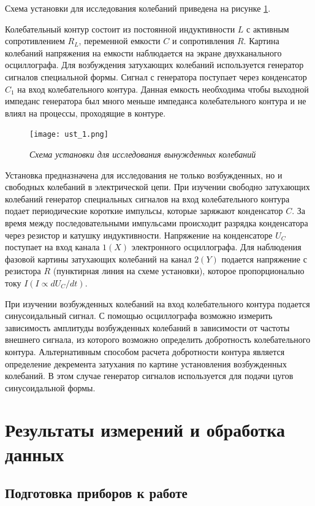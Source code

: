 \documentclass[a4paper,12pt]{article}
\begin{document}
Схема установки для исследования колебаний приведена на рисунке \ref{pic:1}.

Колебательный контур состоит из постоянной индуктивности $L$ с активным сопротивлением $R_L$, переменной емкости $C$ и сопротивления $R$. Картина колебаний напряжения на емкости наблюдается на экране двухканального осциллографа. Для возбуждения затухающих колебаний используется генератор сигналов специальной формы. Сигнал с генератора поступает через конденсатор $C_1$ на вход колебательного контура. Данная емкость необходима чтобы выходной импеданс генератора был много меньше импеданса колебательного контура и не влиял на процессы, проходящие в контуре.

\begin{figure}[h!]
    \texttt{[image: ust\_1.png]}
    \caption{\textit{Схема установки для исследования вынужденных колебаний}}
    \label{pic:1}
\end{figure}

Установка предназначена для исследования не только возбужденных, но и свободных колебаний в электрической цепи. При изучении свободно затухающих колебаний генератор специальных сигналов на вход колебательного контура подает периодические короткие импульсы, которые заряжают конденсатор $C$. За время между последовательными импульсами происходит разрядка конденсатора через резистор и катушку индуктивности. Напряжение на конденсаторе $U_C$ поступает на вход канала $1(X)$ электронного осциллографа. Для наблюдения фазовой картины затухающих колебаний на канал $2(Y)$ подается напряжение с резистора $R$ (пунктирная линия на схеме установки), которое пропорционально току $I (I \propto d U_C / dt)$.

При изучении возбужденных колебаний на вход колебательного контура подается синусоидальный сигнал. С помощью осциллографа возможно измерить зависимость амплитуды возбужденных колебаний в зависимости от частоты внешнего сигнала, из которого возможно определить добротность колебательного контура. Альтернативным способом расчета добротности контура является определение декремента затухания по картине установления возбужденных колебаний. В этом случае генератор сигналов используется для подачи цугов синусоидальной формы.

\section{Результаты измерений и обработка данных}

\subsection{Подготовка приборов к работе}
\end{document}
